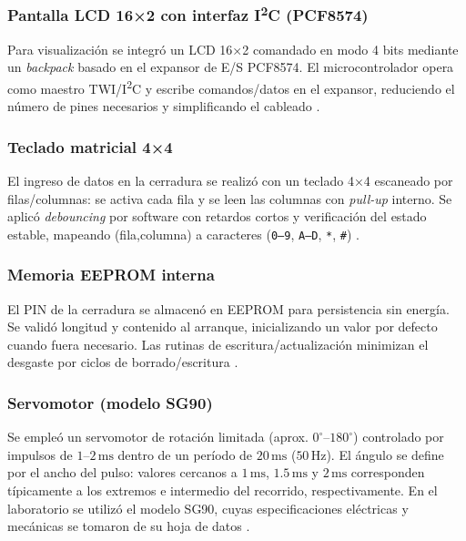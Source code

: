 \subsubsection{Pantalla LCD 16×2 con interfaz I\textsuperscript{2}C (PCF8574)}

Para visualización se integró un LCD 16×2 comandado en modo 4 bits mediante un \textit{backpack} basado en el expansor de E/S PCF8574. El microcontrolador opera como maestro TWI/I\textsuperscript{2}C y escribe comandos/datos en el expansor, reduciendo el número de pines necesarios y simplificando el cableado \cite{lcd_16x2_i2c_datasheet}.

\subsubsection{Teclado matricial 4×4}

El ingreso de datos en la cerradura se realizó con un teclado 4×4 escaneado por filas/columnas: se activa cada fila y se leen las columnas con \textit{pull-up} interno. Se aplicó \textit{debouncing} por software con retardos cortos y verificación del estado estable, mapeando (fila,columna) a caracteres (\texttt{0–9}, \texttt{A–D}, \texttt{*}, \texttt{\#}) \cite{keypad_4x4_okystar}.

\subsubsection{Memoria EEPROM interna}

El PIN de la cerradura se almacenó en EEPROM para persistencia sin energía. Se validó longitud y contenido al arranque, inicializando un valor por defecto cuando fuera necesario. Las rutinas de escritura/actualización minimizan el desgaste por ciclos de borrado/escritura \cite{atmega328p_datasheet}.

\subsubsection{Servomotor (modelo SG90)}

Se empleó un servomotor de rotación limitada (aprox. \(0^{\circ}\)–\(180^{\circ}\)) controlado por impulsos de \(1\text{–}2\,\mathrm{ms}\) dentro de un período de \(20\,\mathrm{ms}\) (\(50\,\mathrm{Hz}\)). El ángulo se define por el ancho del pulso: valores cercanos a \(1\,\mathrm{ms}\), \(1.5\,\mathrm{ms}\) y \(2\,\mathrm{ms}\) corresponden típicamente a los extremos e intermedio del recorrido, respectivamente. En el laboratorio se utilizó el modelo SG90, cuyas especificaciones eléctricas y mecánicas se tomaron de su hoja de datos \cite{servo_sg90_datasheet}.


